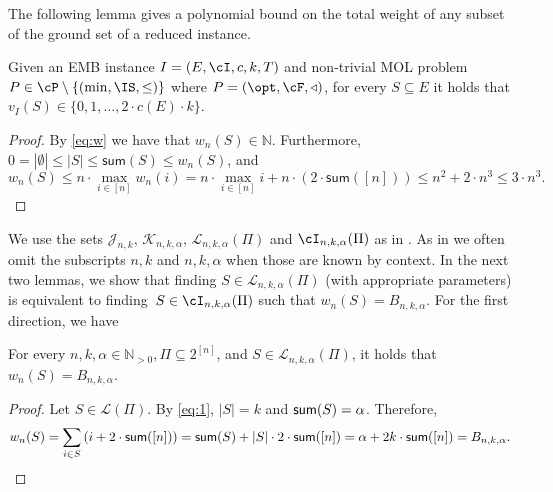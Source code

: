 The following lemma gives a polynomial bound on the total weight of any subset of the ground set of a reduced instance. 

\begin{lemma}
	\label{lem:OPTu}
	Given an \textnormal{EMB} instance $I =(E,\cI,c,k,T)$ and non-trivial  \textnormal{MOL} problem $P \in \cP \setminus \{(\min,\IS,\leq)\}$ where $P = (\opt,\cF,\triangleleft)$, for every $S \subseteq E$ it holds that $v_{I}(S) \in \{0,1,\ldots, 2 \cdot c(E) \cdot k\}$.  
\end{lemma}

\begin{proof}
	By \eqref{eq:w} we have that $w_{n}(S) \in \mathbb{N}$. Furthermore,  $0 = |\emptyset| \leq |S| \leq \textsf{sum}(S) \leq w_{n}(S)$, and  $$w_{n}(S) \leq n \cdot \max_{i \in [n]} w_{n}(i) = n \cdot \max_{i \in [n]} i+ n \cdot (2 \cdot \textsf{sum}([n])) \leq n^2+ 2 \cdot n^3 \leq 3 \cdot n^3.$$ 
\end{proof}


We use the sets $\mathcal{J}_{n,k}$, $\mathcal{K}_{n,k,\alpha}$, $\mathcal{L}_{n,k,\alpha}(\Pi)$ and $\cI_{n,k,\alpha}(\Pi)$  as in . As in  we often omit the subscripts $n,k$ and $n,k,\alpha$ when those are known by context. 
In the next two lemmas, we show that finding  $S \in \mathcal{L}_{n,k,\alpha}(\Pi)$ (with appropriate parameters) is equivalent to finding~$S \in \cI_{n,k,\alpha}(\Pi)$ such that $w_n(S) = B_{n,k,\alpha}$. For the first direction, we have
\begin{lemma}
	\label{lemma:if}
	For every $n,k,\alpha \in \mathbb{N}_{>0}, \Pi \subseteq 2^{[n]}$, and $S \in \mathcal{L}_{n,k,\alpha}(\Pi)$, it holds that $w_{n}(S) = B_{n,k,\alpha}$. 
\end{lemma}
\begin{proof}
	Let $S \in \mathcal{L}(\Pi)$. By \eqref{eq:1}, $|S| = k$ and $\textnormal{\textsf{sum}}(S) = \alpha$. %
	Therefore, \begin{equation*}
		\label{eq:ole}
		\begin{aligned}
			w_{n}(S) = \sum_{i \in S} \left( i+2 \cdot \textnormal{\textsf{sum}}([n])  \right) = \textnormal{\textsf{sum}}(S)+|S| \cdot 2 \cdot \textnormal{\textsf{sum}}([n]) = \alpha+2 k\cdot \textnormal{\textsf{sum}}([n]) = B_{n,k,\alpha}. 
		\end{aligned}
	\end{equation*}
\end{proof}


